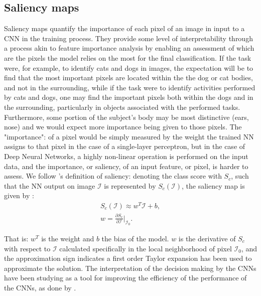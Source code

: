 \subsection{Saliency maps}\label{subsec: saliency}



Saliency maps quantify the importance of each pixel of an image in input to a CNN in the training process. They provide some level of interpretability through a process akin to feature importance analysis by enabling  an assessment of which are the pixels the model relies on the most for the final classification. If the task were, for example, to identify cats and dogs in images, the expectation will be to find that the most important pixels are located within the the dog or cat bodies, and not in the surrounding, while if the task were to identify activities performed by cats and dogs, one may find the important pixels both within the dogs and in the surrounding, particularly in objects associated with the performed tasks. Furthermore, some portion of the subject's body may be most distinctive (ears, nose) and we would expect more importance being given to those pixels. The "importance": of a pixel would be simply measured by the weight the trained NN assigns to that pixel in the case of a single-layer perceptron, but in the case of Deep Neural Networks, a highly non-linear operation is performed on the input data, and the importance, or saliency, of an input feature, or pixel, is harder to assess. We follow \citep{simonyan2014deep}'s definition of saliency: denoting the class score with $S_c$, such that the NN output on image $\mathcal{I}$ is represented by $S_c(\mathcal{I})$, the saliency map is given by :
\begin{eqnarray}
 S_c(\mathcal{I}) \approx w^T \mathcal{I} + b,\\
 w = \frac{\partial S_c}{\partial \mathcal{I}} \biggr\rvert_{\mathcal{I}_0}.
 \end{eqnarray}
 
That is: $w^T$ is the weight and $b$ the bias of the model. $w$ is the derivative of $S_c$ with respect to $\mathcal{I}$ calculated specifically in the local neighborhood of pixel $\mathcal{I}_0$, and the approximation sign indicates a first order Taylor expansion has been used to approximate the solution.
The interpretation of the decision making by the CNNs have been studying as a tool for improving the efficiency of the performance of the CNNs, as done by \citep{DBLP:journals/corr/abs-2105-00937}.


